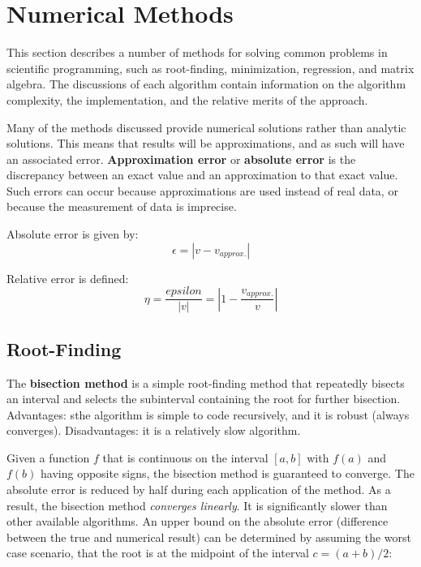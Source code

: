\section{Numerical Methods}

This section describes a number of methods for solving common problems in scientific programming, such as root-finding, minimization, regression, and matrix algebra. The discussions of each algorithm contain information on the algorithm complexity, the implementation, and the relative merits of the approach. 

Many of the methods discussed provide numerical solutions rather than analytic solutions. This means that results will be approximations, and as such will have an associated error. \textbf{Approximation error} or \textbf{absolute error} is the discrepancy between an exact value and an approximation to that exact value. Such errors can occur because approximations are used instead of real data, or because the measurement of data is imprecise. 

Absolute error is given by:
\begin{equation}
\epsilon = |v-v_{approx.}|
\end{equation}

Relative error is defined:
\begin{equation}
\eta = \frac{epsilon}{|v|} = |1 - \frac{v_{approx.}}{v}|
\end{equation}

\subsection{Root-Finding}

The \textbf{bisection method} is a simple root-finding method that repeatedly bisects an interval and selects the subinterval containing the root for further bisection. Advantages: sthe algorithm is simple to code recursively, and it is robust (always converges). Disadvantages: it is a relatively slow algorithm. 

Given a function $f$ that is continuous on the interval $[a,b]$ with $f(a)$ and $f(b)$ having opposite signs, the bisection method is guaranteed to converge. The absolute error is reduced by half during each application of the method. As a result, the bisection method \textit{converges linearly}. It is significantly slower than other available algorithms. An upper bound on the absolute error (difference between the true and numerical result) can be determined by assuming the worst case scenario, that the root is at the midpoint of the interval $c = (a+b)/2$:

